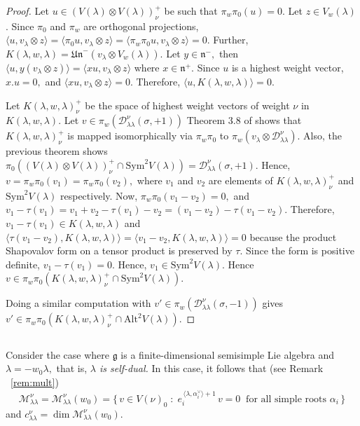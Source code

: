 \documentclass[12pt,reqno]{amsart}
\theoremstyle{plain}
\theoremstyle{definition}
\theoremstyle{plain}
\newcommand{\lie}{\mathfrak}
\begin{document}
\begin{proof}
    Let $u\in (V(\lambda)\otimes V(\lambda))_{\nu}^{+}$ be such that $\pi_w\pi_0(u)=0.$ Let $z\in V_w(\lambda)$. Since $\pi_0$ and $\pi_w$ are orthogonal projections,
    $\langle u, v_\lambda\otimes z\rangle=\langle \pi_0 u, v_\lambda\otimes z\rangle=\langle \pi_w\pi_0 u, v_\lambda\otimes z\rangle=0.$ Further, $K(\lambda,w,\lambda)=\lie{Un}^-(v_\lambda\otimes V_w(\lambda)).$ Let $y \in \lie n^-,$ then $\langle  u, y(v_\lambda\otimes z)\rangle=\langle xu,v_\lambda\otimes z\rangle$ where $x\in \lie n^+.$ Since $u$ is a highest weight vector, $x.u=0,$ and $\langle xu,v_\lambda\otimes z\rangle=0.$ Therefore, $\langle u, K(\lambda,w,\lambda)\rangle=0.$
    
    Let $K(\lambda,w,\lambda)_{\nu}^{+}$ be the space of highest weight vectors of weight $\nu$ in $K(\lambda,w,\lambda).$
    Let $v\in \pi_w( \mathcal{D}_{\lambda\lambda}^{\nu}(\sigma,+1))$ Theorem 3.8 of \cite{MRV} shows that $K(\lambda,w,\lambda)_{\nu}^{+}$ is mapped isomorphically via $\pi_w\pi_0$ to $ \pi_w(v_\lambda\otimes \mathcal{D}_{\lambda\lambda}^{\nu}).$ 
    Also, the previous theorem shows $\pi_0((V(\lambda)\otimes V(\lambda))_{\nu}^{+}\cap \text{Sym}^2V(\lambda)) = \mathcal{D}_{\lambda\lambda}^{\nu}(\sigma,+1).$ 
    Hence, $v=\pi_w\pi_0(v_1)=\pi_w\pi_0(v_2),$ where $v_1$ and $v_2$ are elements of $K(\lambda,w,\lambda)_{\nu}^{+}$ and  $\text{Sym}^2V(\lambda)$ respectively. Now, $\pi_w\pi_0(v_1-v_2)=0,$ and $v_1-\tau(v_1)=v_1+v_2- \tau(v_1)-v_2=(v_1-v_2)-\tau(v_1-v_2).$ Therefore, $v_1-\tau(v_1)\in K(\lambda,w,\lambda)$ and $\langle\tau(v_1-v_2), K(\lambda,w,\lambda)\rangle=\langle v_1-v_2, K(\lambda,w,\lambda)\rangle=0$ because the product Shapovalov form on a tensor product is preserved by $\tau.$ Since the form is positive definite, $v_1-\tau(v_1)=0.$ Hence, $v_1\in \text{Sym}^2V(\lambda).$ Hence $v\in \pi_w\pi_0(K(\lambda,w,\lambda)^+_{\nu}\cap\text{Sym}^2V(\lambda)).$
    
    Doing a similar computation with $v'\in \pi_w( \mathcal{D}_{\lambda\lambda}^{\nu}(\sigma,-1))$ gives $v'\in \pi_w\pi_0(K(\lambda,w,\lambda)^+_{\nu}\cap\text{Alt}^2V(\lambda)). $
    


\end{proof}



\subsection{}
Consider the case where $\lie g$ is a finite-dimensional semisimple Lie algebra and $\lambda=-w_0\lambda,$ that is, \textit{$\lambda$ is self-dual.}
In this case, it follows that (see Remark ~\ref{rem:mult})  $$\mathcal{M}_{\lambda\lambda}^{\nu}=\mathcal{M}_{\lambda\lambda}^{\nu}(w_0)=\{\,v\in V(\nu)_{0}\;:\;
    e_i^{\,\langle\lambda,\alpha_i^\vee\rangle+1}\,v=0\ \text{ for all simple roots } \alpha_i\,\}$$ and 
$
c^{\nu}_{\lambda\lambda}=\dim\mathcal{M}_{\lambda\lambda}^{\nu}(w_0).
$
\end{document}
